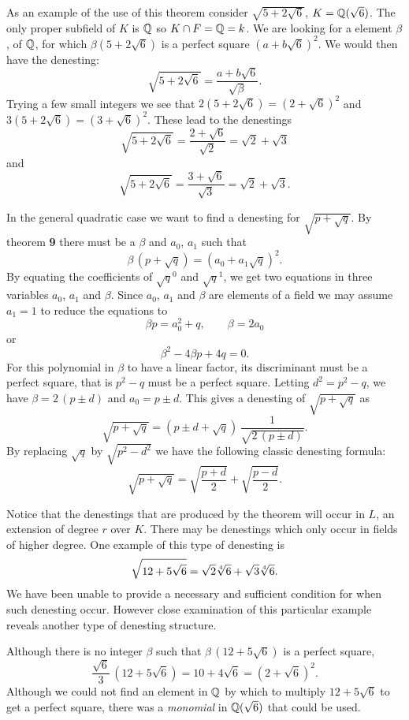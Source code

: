 As an example of the use of this theorem consider $\sqrt{5 + 2 \sqrt{6}}$,
$K = \mathbb{Q}(\sqrt{6})$.  The only proper subfield of $K$ is $\mathbb{Q}$
so $K \cap F = \mathbb{Q} = k$.  We are looking for a element $\beta$, of $\mathbb{Q}$, for 
which $\beta (5 + 2 \sqrt{6})$ is a perfect square $(a + b \sqrt{6})^2$.
We would then have the denesting: 
\[
\sqrt{5 + 2 \sqrt{6}} = \frac{a + b \sqrt{6}}{\sqrt{\beta}}.
\]
Trying a few small integers we see that 
$2 (5 + 2 \sqrt{6}) = (2 + \sqrt{6})^2$ and 
$3 (5 + 2 \sqrt{6}) = (3 + \sqrt{6})^2$.
These lead to the denestings
\[
\sqrt{5 +2\sqrt{6}} =\frac{2 + \sqrt{6}}{\sqrt{2}} = \sqrt{2} + \sqrt{3}
\]
and 
\[
\sqrt{5 +2\sqrt{6}} = \frac{3 + \sqrt{6}}{\sqrt{3}} = \sqrt{2} + \sqrt{3}.
\]

In the general quadratic case we want to find a denesting for $\sqrt{p +
\sqrt{q}}$.    By theorem {\bf 9} there must be a $\beta$ and $a_0$,
$a_1$ such that 
\[
\beta\,(p + \sqrt{q}) = (a_0 + a_1 \sqrt{q})^2.
\]
By equating the coefficients of $\sqrt{q}^0$ and $\sqrt{q}^1$, we get
two equations in three variables $a_0$, $a_1$ and $\beta$.
Since $a_0$, $a_1$ and $\beta$ are elements of a field we may assume $a_1 = 1$
to reduce the equations to 
\[
\beta p = a_0^2 + q, \qquad \beta = 2 a_0
\]
or
\[
\beta^2 - 4 \beta p + 4 q = 0.
\]
For this polynomial in $\beta$ to have a linear factor, its discriminant
must be a perfect square, that is $p^2 - q$ must be a perfect square.   
Letting $d^2 = p^2 - q$, we have $\beta = 2\,(p \pm d)$ and 
$a_0 = p \pm d$.  This gives a denesting of $\sqrt{p + \sqrt{q}}$ as
\[
\sqrt{p + \sqrt{q}} = \left(p \pm d + \sqrt{q}\right) 
\,\frac{1}{\sqrt{2 \,(p \pm d)}}.
\]
By replacing $\sqrt{q}$ by $\sqrt{p^2 - d^2}$ we have the following
classic denesting formula: 
\[
\sqrt{p + \sqrt{q}} = \sqrt{\frac{p + d}{2}} +  
                      \sqrt{\frac{p - d}{2}}.
\]

\medskip
Notice that the denestings that are produced by the theorem 
will occur in $L$, an extension of degree $r$ over $K$.  
There may be denestings which only occur in fields of higher degree.
One example of this type of denesting is
\[
\sqrt{12 + 5\sqrt{6}} = \sqrt{2} \root 4 \of 6 + \sqrt{3} \root 4 \of 6.
\]
We have been unable to provide a necessary and sufficient condition for
when such denesting occur.  However close examination of this particular
example reveals another type of denesting structure.

Although there is no integer $\beta$ such that $\beta\,(12 + 5 \sqrt{6})$
is a perfect square,
\[
\frac{\sqrt{6}}{3} \, (12 + 5 \sqrt{6}) = 10 + 4 \sqrt{6} = (2 + \sqrt{6})^2.
\]
Although we could not find an element in $\mathbb{Q}$ by which to multiply 
$12 + 5 \sqrt{6}$ to get a perfect square, there was a {\em monomial} in
$\mathbb{Q}(\sqrt{6})$ that could be used.

